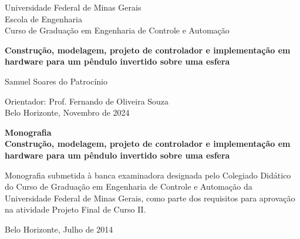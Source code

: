 \begin{titlepage}
\begin{center}
{\large Universidade Federal de Minas Gerais\\
Escola de Engenharia \\
Curso de Graduação em Engenharia de Controle e Automação\\}

\vspace{6cm}
{\bf\Large Construção, modelagem, projeto de controlador e implementação em hardware para um pêndulo invertido sobre uma esfera\vspace{0.2cm}}
\vspace{4cm}

{\large Samuel Soares do Patrocínio}
\vspace{2cm}  
   
\vspace{2cm}          
{\large Orientador: Prof. Fernando de Oliveira Souza}\\

\vfill
{\large Belo Horizonte, Novembro de 2024 }
\end{center}

\end{titlepage}

\newpage
\clearpage
\thispagestyle{empty}


\begin{titlepage}

\centering
\textbf{Monografia}\\
\vspace{2cm}
\centering
\textbf{Construção, modelagem, projeto de controlador e implementação em hardware para um pêndulo invertido sobre uma esfera}\\
\vspace{5cm} 

\parbox{1.0\textwidth} 
{\large 
Monografia submetida à banca examinadora
designada pelo Colegiado Didático do Curso de
Graduação em Engenharia de Controle e
Automação da Universidade Federal de Minas
Gerais, como parte dos requisitos para aprovação na
atividade Projeto Final de Curso II.}

\vspace{7cm} 
\centering
Belo Horizonte, Julho de 2014

\end{titlepage}
